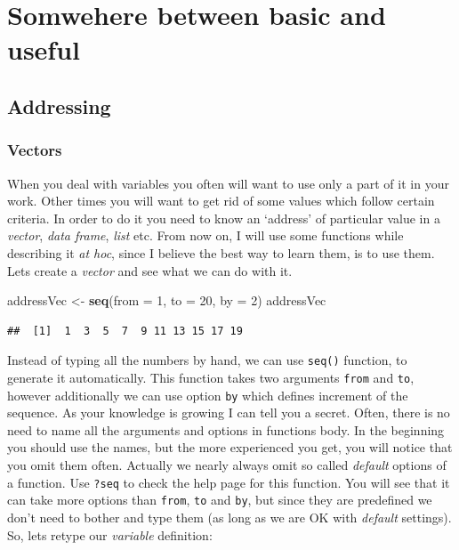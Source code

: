 \documentclass[]{book}
\newenvironment{Shaded}{\begin{snugshade}}{\end{snugshade}}
\newcommand{\KeywordTok}[1]{\textcolor[rgb]{0.13,0.29,0.53}{\textbf{#1}}}
\newcommand{\DataTypeTok}[1]{\textcolor[rgb]{0.13,0.29,0.53}{#1}}
\newcommand{\DecValTok}[1]{\textcolor[rgb]{0.00,0.00,0.81}{#1}}
\newcommand{\StringTok}[1]{\textcolor[rgb]{0.31,0.60,0.02}{#1}}
\newcommand{\NormalTok}[1]{#1}
\theoremstyle{definition}
\theoremstyle{definition}
\theoremstyle{definition}
\theoremstyle{remark}
\begin{document}
\chapter{Somwehere between basic and
useful}\label{somwehere-between-basic-and-useful}

\section{Addressing}\label{addressing}

\subsection{Vectors}\label{vectors}

When you deal with variables you often will want to use only a part of
it in your work. Other times you will want to get rid of some values
which follow certain criteria. In order to do it you need to know an
`address' of particular value in a \emph{vector}, \emph{data frame},
\emph{list} etc. From now on, I will use some functions while describing
it \emph{at hoc}, since I believe the best way to learn them, is to use
them. Lets create a \emph{vector} and see what we can do with it.

\begin{Shaded}
\begin{Highlighting}[]
\NormalTok{addressVec <-}\StringTok{ }\KeywordTok{seq}\NormalTok{(}\DataTypeTok{from =} \DecValTok{1}\NormalTok{, }\DataTypeTok{to =} \DecValTok{20}\NormalTok{, }\DataTypeTok{by =} \DecValTok{2}\NormalTok{)}
\NormalTok{addressVec}
\end{Highlighting}
\end{Shaded}

\begin{verbatim}
##  [1]  1  3  5  7  9 11 13 15 17 19
\end{verbatim}

Instead of typing all the numbers by hand, we can use \texttt{seq()}
function, to generate it automatically. This function takes two
arguments \texttt{from} and \texttt{to}, however additionally we can use
option \texttt{by} which defines increment of the sequence. As your
knowledge is growing I can tell you a secret. Often, there is no need to
name all the arguments and options in functions body. In the beginning
you should use the names, but the more experienced you get, you will
notice that you omit them often. Actually we nearly always omit so
called \emph{default} options of a function. Use \texttt{?seq} to check
the help page for this function. You will see that it can take more
options than \texttt{from}, \texttt{to} and \texttt{by}, but since they
are predefined we don't need to bother and type them (as long as we are
OK with \emph{default} settings). So, lets retype our \emph{variable}
definition:
\end{document}
